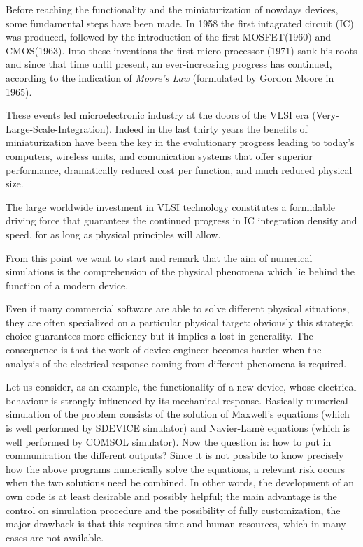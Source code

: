 Before reaching the functionality and the miniaturization of nowdays devices, some fundamental steps have been made.
In 1958 the first intagrated circuit (IC) was produced, followed by the introduction of the first MOSFET(1960) and CMOS(1963). Into these inventions the first micro-processor (1971) sank his roots  and since that time until present, an ever-increasing progress has continued, according to the indication of \textit{Moore's Law} (formulated by Gordon Moore in 1965).

These events led microelectronic industry at the doors of the VLSI era (Very-Large-Scale-Integration). Indeed in the last thirty years the benefits of miniaturization have been the key in the evolutionary progress leading to today's computers, wireless units, and comunication systems that offer superior performance, dramatically reduced cost per function, and much reduced physical size.

The large worldwide investment in VLSI technology constitutes a formidable driving force that guarantees the continued progress in IC integration density and speed, for as long as physical principles will allow.

From this point we want to start and remark that the aim of numerical simulations is the comprehension of the physical phenomena which lie behind the function of a modern device. 

Even if many commercial software are able to solve different physical situations, they are often specialized on a particular physical target: obviously this strategic choice guarantees more efficiency but it implies a lost in generality. The consequence is that the work of device engineer becomes harder when the analysis of the electrical response coming from different phenomena is required. 

Let us consider, as an example, the functionality of a new device, whose electrical behaviour is strongly influenced by its mechanical response. Basically numerical simulation of the problem consists of the solution of Maxwell's equations (which is well performed by SDEVICE simulator) and Navier-Lam\`e equations (which is well performed by COMSOL simulator). Now the question is: how to put in communication the different outputs?
Since it is not possbile to know precisely how the above programs numerically solve the equations, a relevant risk occurs when the two solutions need be combined. 
In other words, the development of an own code is at least desirable and possibly helpful; the main advantage is the control on simulation procedure and the possibility of fully customization, the major drawback is that this requires time and human resources, which in many cases are not available.   


